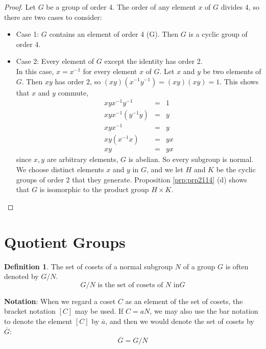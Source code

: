 \documentclass[
]{book}
\providecommand{\tightlist}{%
  \setlength{\itemsep}{0pt}\setlength{\parskip}{0pt}}
\theoremstyle{definition}
\newtheorem{definition}{Definition}[chapter]
\theoremstyle{definition}
\theoremstyle{definition}
\theoremstyle{definition}
\theoremstyle{remark}
\begin{document}
\begin{proof}

Let \(G\) be a group of order 4. The order of any element \(x\) of \(G\) divides 4, so there are two cases to consider:

\begin{itemize}
\tightlist
\item
  Case 1: \(G\) contains an element of order 4 (\textbar G). Then \(G\) is a cyclic group of order 4.
\item
  Case 2: Every element of \(G\) except the identity has order 2.\\
  In this case, \(x = x^{-1}\) for every element \(x\) of \(G\). Let \(x\) and \(y\) be two elements of \(G\). Then \(xy\) has order 2, so \((xy)(x^{-1}y^{-1}) = (xy)(xy) = 1\). This shows that \(x\) and \(y\) commute,
  \begin{eqnarray}
  xyx^{-1}y^{-1} &=& 1\\
  xyx^{-1}(y^{-1} y)&=& y\\
  xyx^{-1}&=& y\\
  xy(x^{-1}x)&=& yx\\
  xy &=& yx
  \end{eqnarray}
  since \(x,y\) are arbitrary elements, \(G\) is abelian. So every subgroup is normal. We choose distinct elements \(x\) and \(y\) in \(G\), and we let \(H\) and \(K\) be the cyclic groups of order 2 that they generate. Proposition \ref{prp:prp2114} (d) shows that \(G\) is isomorphic to the product group \(H \times K\).
\end{itemize}

\end{proof}

\hypertarget{quotient-groups}{%
\section{Quotient Groups}\label{quotient-groups}}

\begin{definition}
\protect\hypertarget{def:unnamed-chunk-48}{}\label{def:unnamed-chunk-48}The set of cosets of a normal subgroup \(N\) of a group \(G\) is often denoted by \(G / N\).
\[G / N \text{ is the set of cosets of $N$ in} G\]
\end{definition}

\textbf{Notation}: When we regard a coset \(C\) as an element of the set of cosets, the bracket notation \([C]\)
may be used.
If \(C = aN\), we may also use the bar notation to denote the element \([C]\) by \(\overline{a}\),
and then we would denote the set of cosets by \(\overline{G}\):
\[\overline{G} = G /N\]
\end{document}
